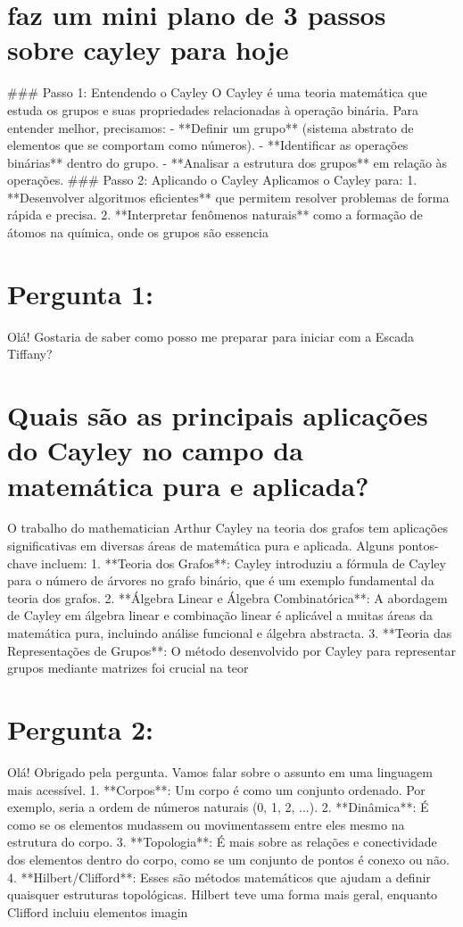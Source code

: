 \documentclass[11pt,a4paper]{article}
\begin{document}
\section{faz um mini plano de 3 passos sobre cayley para hoje}
\#\#\# Passo 1: Entendendo o Cayley O Cayley é uma teoria matemática que estuda os grupos e suas propriedades relacionadas à operação binária. Para entender melhor, precisamos: - **Definir um grupo** (sistema abstrato de elementos que se comportam como números). - **Identificar as operações binárias** dentro do grupo. - **Analisar a estrutura dos grupos** em relação às operações. \#\#\# Passo 2: Aplicando o Cayley Aplicamos o Cayley para: 1. **Desenvolver algoritmos eficientes** que permitem resolver problemas de forma rápida e precisa. 2. **Interpretar fenômenos naturais** como a formação de átomos na química, onde os grupos são essencia

\section{Pergunta 1:}
Olá! Gostaria de saber como posso me preparar para iniciar com a Escada Tiffany?

\section{Quais são as principais aplicações do Cayley no campo da matemática pura e aplicada?}
O trabalho do mathematician Arthur Cayley na teoria dos grafos tem aplicações significativas em diversas áreas de matemática pura e aplicada. Alguns pontos-chave incluem: 1. **Teoria dos Grafos**: Cayley introduziu a fórmula de Cayley para o número de árvores no grafo binário, que é um exemplo fundamental da teoria dos grafos. 2. **Álgebra Linear e Álgebra Combinatórica**: A abordagem de Cayley em álgebra linear e combinação linear é aplicável a muitas áreas da matemática pura, incluindo análise funcional e álgebra abstracta. 3. **Teoria das Representações de Grupos**: O método desenvolvido por Cayley para representar grupos mediante matrizes foi crucial na teor

\section{Pergunta 2:}
Olá! Obrigado pela pergunta. Vamos falar sobre o assunto em uma linguagem mais acessível. 1. **Corpos**: Um corpo é como um conjunto ordenado. Por exemplo, seria a ordem de números naturais (0, 1, 2, ...). 2. **Dinâmica**: É como se os elementos mudassem ou movimentassem entre eles mesmo na estrutura do corpo. 3. **Topologia**: É mais sobre as relações e conectividade dos elementos dentro do corpo, como se um conjunto de pontos é conexo ou não. 4. **Hilbert/Clifford**: Esses são métodos matemáticos que ajudam a definir quaisquer estruturas topológicas. Hilbert teve uma forma mais geral, enquanto Clifford incluiu elementos imagin
\end{document}
